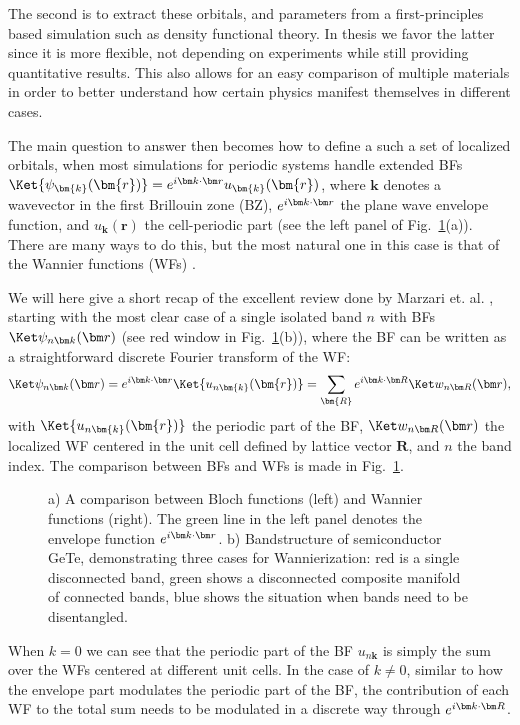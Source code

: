 The second is to extract these orbitals, and parameters from a first-principles based simulation such as density functional theory.
In thesis we favor the latter since it is more flexible, not depending on experiments while still providing quantitative results.
This also allows for an easy comparison of multiple materials in order to better understand how certain physics manifest themselves in different cases. 

The main question to answer then becomes how to define a such a set of localized orbitals, when most simulations for periodic systems handle extended BFs $\Ket{\psi_{\bm{k}}(\bm{r})} = \eikr{r} u_{\bm{k}}(\bm{r})$, where $\bm{k}$ denotes a wavevector in the first Brillouin zone (BZ), $\eikr{r}$ the plane wave envelope function, and $u_{\bm{k}}(\bm{r})$ the cell-periodic part (see the left panel of Fig.~\ref{fig:Theory_blochvswan}(a)).
There are many ways to do this, but the most natural one in this case is that of the Wannier functions (WFs) \cite{Wannier1937}.

We will here give a short recap of the excellent review done by Marzari et. al. \cite{Marzari2012}, starting with the most clear case of a single isolated band $n$ with BFs $\BlochKet{n}$ (see red window in Fig.~\ref{fig:Theory_blochvswan}(b)), where the BF can be written as a straightforward discrete Fourier transform of the WF: 
\begin{equation}
	\label{eq:Theory_1bandwan}
	\BlochKet{n} = \eikr{r} \Ket{u_{n\bm{k}}(\bm{r})} = \sum_{\bm{R}} \eikr{R} \WanKet{n}{R},
\end{equation}
with $\Ket{u_{n\bm{k}}(\bm{r})}$ the periodic part of the BF, $\WanKet{n}{R}$ the localized WF centered in the unit cell defined by lattice vector $\bm{R}$, and $n$ the band index.
The comparison between BFs and WFs is made in Fig.~\ref{fig:Theory_blochvswan}.
\begin{figure}
	\begin{subfigure}{0.49\textwidth}
		\caption{}
	\end{subfigure}
	\begin{subfigure}{0.49\textwidth}
		\caption{}
	\end{subfigure}
	\caption{\label{fig:Theory_blochvswan} a) A comparison between Bloch functions (left) and Wannier functions (right). The green line in the left panel denotes the envelope function $\eikr{r}$. b) Bandstructure of semiconductor GeTe, demonstrating three cases for Wannierization: red is a single disconnected band, green shows a disconnected composite manifold of connected bands, blue shows the situation when bands need to be disentangled.}
\end{figure}
When $k=0$ we can see that the periodic part of the BF $u_{n\bm{k}}$ is simply the sum over the WFs centered at different unit cells.
In the case of $k \neq 0$, similar to how the envelope part modulates the periodic part of the BF, the contribution of each WF to the total sum needs to be modulated in a discrete way through $\eikr{R}$.

